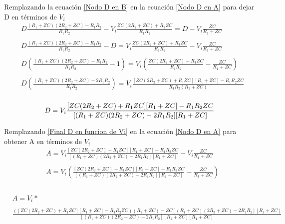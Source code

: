         Remplazando la ecuación \ref{Nodo D en B} en la ecuación \ref{Nodo D en A} para dejar D en términos de $V_{i}$
        \begin{align*}
            &D\frac{ (R_{1}+ZC)(2R_{2}+ZC) - R_{1}R_{2} }{ R_{1}R_{2}} - V_{i}\frac{ ZC(2R_{2}+ZC)+ R_{1}ZC }{ R_{1}R_{2}} = D - V_{i}\frac{ZC}{R_{1}+ZC} \\\\
            &D\frac{ (R_{1}+ZC)(2R_{2}+ZC) -  R_{1}R_{2} }{ R_{1}R_{2}} - D = V_{i}\frac{ ZC(2R_{2}+ZC)+ R_{1}ZC }{ R_{1}R_{2}} - V_{i}\frac{ZC}{R_{1}+ZC} \\\\
            &D(\frac{ (R_{1}+ZC)(2R_{2}+ZC) -  R_{1}R_{2} }{ R_{1}R_{2} } - 1) = V_{i}(\frac{ ZC(2R_{2}+ZC)+ R_{1}ZC }{ R_{1}R_{2}} - \frac{ZC}{R_{1}+ZC}) \\\\
            &D(\frac{ (R_{1}+ZC)(2R_{2}+ZC) -  2R_{1}R_{2} }{ R_{1}R_{2} }) = V_{i}\frac{ [ZC(2R_{2}+ZC)+ R_{1}ZC][R_{1}+ZC] - R_{1}R_{2}ZC }{ R_{1}R_{2}(R_{1}+ZC)} \\\\
        \end{align*}
        \begin{equation}\label{Final D en funcion de Vi}
            D = V_{i}\frac{ [ZC(2R_{2}+ZC)+ R_{1}ZC][R_{1}+ZC] - R_{1}R_{2}ZC }{ [(R_{1}+ZC)(2R_{2}+ZC) -  2R_{1}R_{2}][R_{1}+ZC]} \\\\
        \end{equation}
    
        Remplazando \ref{Final D en funcion de Vi} en la ecuación \ref{Nodo D en A} para obtener A en términos de $V_{i}$
        \begin{align*}
            &A = V_{i}\frac{ [ZC(2R_{2}+ZC)+ R_{1}ZC][R_{1}+ZC] - R_{1}R_{2}ZC }{ [(R_{1}+ZC)(2R_{2}+ZC) -  2R_{1}R_{2}][R_{1}+ZC]} - V_{i}\frac{ZC}{R_{1}+ZC}\\\\
            &A = V_{i}(\frac{ [ZC(2R_{2}+ZC)+ R_{1}ZC][R_{1}+ZC] - R_{1}R_{2}ZC }{ [(R_{1}+ZC)(2R_{2}+ZC) -  2R_{1}R_{2}][R_{1}+ZC]} - \frac{ZC}{R_{1}+ZC})\\\\
        \end{align*}

        \small
        \begin{equation}\label{Final A en funcion de Vi}
            \begin{aligned}
                & A = V_{i} *\\\\
                & \frac{ ([ZC(2R_{2}+ZC)+ R_{1}ZC][R_{1}+ZC] - R_{1}R_{2}ZC)(R_{1}+ZC) - ZC[(R_{1}+ZC)(2R_{2}+ZC) -  2R_{1}R_{2}][R_{1}+ZC] }{ [(R_{1}+ZC)(2R_{2}+ZC) -  2R_{1}R_{2}][R_{1}+ZC][R_{1}+ZC] }\\
            \end{aligned}
        \end{equation}
        \normalsize
    
